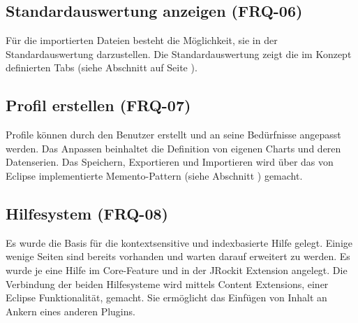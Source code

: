 \subsection{Standardauswertung anzeigen (FRQ-06)}
Für die importierten Dateien besteht die Möglichkeit, sie in der Standardauswertung darzustellen. Die Standardauswertung zeigt die im Konzept definierten Tabs (siehe Abschnitt  auf Seite \pageref{standardreport}).

\subsection{Profil erstellen (FRQ-07)}
Profile können durch den Benutzer erstellt und an seine Bedürfnisse angepasst werden. Das Anpassen beinhaltet die Definition von eigenen Charts und deren Datenserien. Das Speichern, Exportieren und Importieren wird über das von Eclipse implementierte Memento-Pattern (siehe Abschnitt ) gemacht.

\subsection{Hilfesystem (FRQ-08)}
Es wurde die Basis für die kontextsensitive und indexbasierte Hilfe gelegt. Einige wenige Seiten sind bereits vorhanden und warten darauf erweitert zu werden. Es wurde je eine Hilfe im Core-Feature und in der JRockit Extension angelegt. Die Verbindung der beiden Hilfesysteme wird mittels Content Extensions, einer Eclipse Funktionalität, gemacht. Sie ermöglicht das Einfügen von Inhalt an Ankern eines anderen Plugins.

